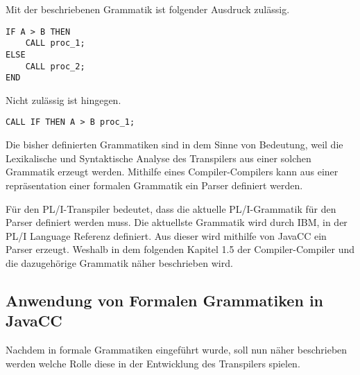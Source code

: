 Mit der beschriebenen Grammatik ist folgender Ausdruck zulässig.

\begin{verbatim}
IF A > B THEN 
	CALL proc_1;
ELSE 
	CALL proc_2;
END
\end{verbatim}

Nicht zulässig ist hingegen.

\begin{verbatim} 
CALL IF THEN A > B proc_1;
\end{verbatim}

	
Die bisher definierten Grammatiken sind in dem Sinne von Bedeutung, weil die Lexikalische und Syntaktische Analyse des Transpilers aus einer solchen Grammatik erzeugt werden. Mithilfe eines Compiler-Compilers kann aus einer repräsentation einer formalen Grammatik ein Parser definiert werden.
 
Für den PL/I-Transpiler bedeutet, dass die aktuelle PL/I-Grammatik für den Parser definiert werden muss. Die aktuellste Grammatik wird durch IBM, in der PL/I Language Referenz definiert. Aus dieser wird mithilfe von JavaCC ein Parser erzeugt. Weshalb in dem folgenden Kapitel 1.5 der Compiler-Compiler und die dazugehörige Grammatik näher beschrieben wird.

     
\subsection{Anwendung von Formalen Grammatiken in JavaCC}

Nachdem in formale Grammatiken eingeführt wurde, soll nun näher beschrieben werden welche Rolle diese in der Entwicklung des Transpilers spielen.

